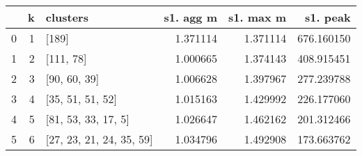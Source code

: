 \begin{tabular}{lrlrrr}
\toprule
{} &  k &                  clusters &  s1. agg m &  s1. max m &    s1. peak \\
\midrule
0 &  1 &                     [189] &   1.371114 &   1.371114 &  676.160150 \\
1 &  2 &                 [111, 78] &   1.000665 &   1.374143 &  408.915451 \\
2 &  3 &              [90, 60, 39] &   1.006628 &   1.397967 &  277.239788 \\
3 &  4 &          [35, 51, 51, 52] &   1.015163 &   1.429992 &  226.177060 \\
4 &  5 &       [81, 53, 33, 17, 5] &   1.026647 &   1.462162 &  201.312466 \\
5 &  6 &  [27, 23, 21, 24, 35, 59] &   1.034796 &   1.492908 &  173.663762 \\
\bottomrule
\end{tabular}
